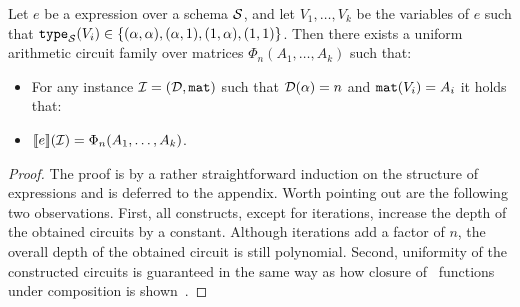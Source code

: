 
\begin{theorem}
\label{th-ml-to-circuits}
Let $e$ be a \langfor expression over a schema $\mathcal{S}$, and let $V_1,\ldots ,V_k$ be the variables of $e$ such that $\texttt{type}_{\mathcal{S}}(V_i)\in \{(\alpha,\alpha), (\alpha,1), (1,\alpha), (1,1)\}$. Then there exists a uniform arithmetic circuit family over matrices $\Phi_n(A_1,\ldots ,A_k)$ such that:
\begin{itemize}
\item For any instance $\mathcal{I} = (\mathcal{D},\texttt{mat})$ such that $\mathcal{D}(\alpha) = n$ and $\texttt{mat}(V_i) = A_i$ it holds that:
\item $\llbracket e \rrbracket(\mathcal{I}) = \Phi_n(A_1,\ldots ,A_k)$.
\end{itemize}
\end{theorem}
\begin{proof}
The proof is by a rather straightforward induction on the structure of \langfor expressions and is deferred to the appendix. Worth pointing out are the following two observations. First, all \langfor constructs, except for iterations, increase the depth of the obtained circuits by a constant. Although iterations add a factor of $n$, the overall depth of the obtained circuit is still polynomial. Second, uniformity of the constructed circuits is guaranteed in the same way as how closure of 
\logspace\ functions under composition is shown~\cite{aroraB2009}.
\end{proof}


